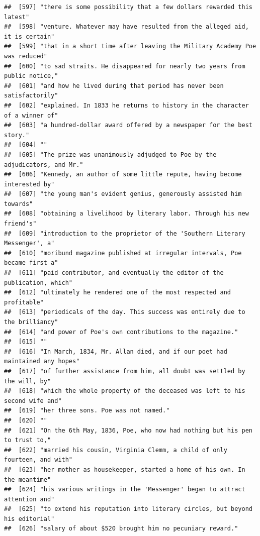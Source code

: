 \documentclass{article}\usepackage[]{graphicx}\usepackage[]{color}
\makeatletter
\newenvironment{kframe}{%
 \def\at@end@of@kframe{}%
 \ifinner\ifhmode%
  \def\at@end@of@kframe{\end{minipage}}%
  \begin{minipage}{\columnwidth}%
 \fi\fi%
 \def\FrameCommand##1{\hskip\@totalleftmargin \hskip-\fboxsep
 \colorbox{shadecolor}{##1}\hskip-\fboxsep
     \hskip-\linewidth \hskip-\@totalleftmargin \hskip\columnwidth}%
 \MakeFramed {\advance\hsize-\width
   \@totalleftmargin\z@ \linewidth\hsize
   \@setminipage}}%
 {\par\unskip\endMakeFramed%
 \at@end@of@kframe}
\newenvironment{knitrout}{}{} %
\makeatother
\begin{document}
\begin{knitrout}
\begin{kframe}
\begin{verbatim}
##  [597] "there is some possibility that a few dollars rewarded this latest"           
##  [598] "venture. Whatever may have resulted from the alleged aid, it is certain"     
##  [599] "that in a short time after leaving the Military Academy Poe was reduced"     
##  [600] "to sad straits. He disappeared for nearly two years from public notice,"     
##  [601] "and how he lived during that period has never been satisfactorily"           
##  [602] "explained. In 1833 he returns to history in the character of a winner of"    
##  [603] "a hundred-dollar award offered by a newspaper for the best story."           
##  [604] ""                                                                            
##  [605] "The prize was unanimously adjudged to Poe by the adjudicators, and Mr."      
##  [606] "Kennedy, an author of some little repute, having become interested by"       
##  [607] "the young man's evident genius, generously assisted him towards"             
##  [608] "obtaining a livelihood by literary labor. Through his new friend's"          
##  [609] "introduction to the proprietor of the 'Southern Literary Messenger', a"      
##  [610] "moribund magazine published at irregular intervals, Poe became first a"      
##  [611] "paid contributor, and eventually the editor of the publication, which"       
##  [612] "ultimately he rendered one of the most respected and profitable"             
##  [613] "periodicals of the day. This success was entirely due to the brilliancy"     
##  [614] "and power of Poe's own contributions to the magazine."                       
##  [615] ""                                                                            
##  [616] "In March, 1834, Mr. Allan died, and if our poet had maintained any hopes"    
##  [617] "of further assistance from him, all doubt was settled by the will, by"       
##  [618] "which the whole property of the deceased was left to his second wife and"    
##  [619] "her three sons. Poe was not named."                                          
##  [620] ""                                                                            
##  [621] "On the 6th May, 1836, Poe, who now had nothing but his pen to trust to,"     
##  [622] "married his cousin, Virginia Clemm, a child of only fourteen, and with"      
##  [623] "her mother as housekeeper, started a home of his own. In the meantime"       
##  [624] "his various writings in the 'Messenger' began to attract attention and"      
##  [625] "to extend his reputation into literary circles, but beyond his editorial"    
##  [626] "salary of about $520 brought him no pecuniary reward."                       

\end{verbatim}
\end{kframe}
\end{knitrout}
\end{document}

